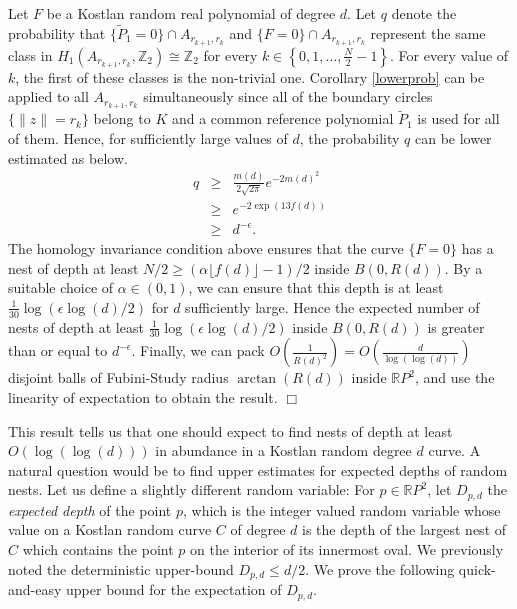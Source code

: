 \documentclass [11pt]{amsart}
\theoremstyle{remark}
\numberwithin{equation}{section}
\numberwithin{theorem}{section}
\begin{document}
Let $F$ be a Kostlan random real polynomial of degree $d$. Let $q$ denote the probability that $\{\widetilde{P}_{1}=0\}\cap A_{r_{k+1},r_{k}}$ and $\{F=0\}\cap A_{r_{k+1},r_{k}}$ represent the same class in $H_{1}(A_{r_{k+1}, r_{k}}, \mathbb{Z}_{2})\cong \mathbb{Z}_{2}$ for every $\displaystyle{k\in\left\{0,1,\ldots,\frac{N}{2}-1\right\}}$. For every value of $k$, the first of these classes is the non-trivial one. Corollary \ref{lowerprob} can be applied to all $A_{r_{k+1},r_{k}}$ simultaneously since all of the boundary circles $\{\|z\|=r_{k}\}$ belong to $K$ and a common reference polynomial $\widetilde{P}_{1}$ is used for all of them. Hence, for sufficiently large values of $d$, the probability $q$ can be lower estimated as below. 
\begin{eqnarray*} 
q&\geq& \frac{m(d)}{2\sqrt{2\pi}} e^{-2m(d)^2}\\
&\geq&e^{-2\exp(13f(d))} \\
&\geq& d^{-\epsilon}. 
\end{eqnarray*} 
The homology invariance condition above ensures that the curve $\{F=0\}$ has a nest of depth at least  $\displaystyle{N/2\geq (\alpha \lfloor f(d) \rfloor-1)/2}$ inside $B(0,R(d))$. By a suitable choice of $\alpha\in (0,1)$, we can ensure that this depth is at least $\displaystyle{\frac{1}{30}\log(\epsilon \log(d)/2)}$ for $d$ sufficiently large. Hence the expected number of nests of depth at least $\displaystyle{\frac{1}{30}\log(\epsilon \log(d)/2)}$ inside $B(0,R(d))$ is greater than or equal to $d^{-\epsilon}$. Finally, we can pack
 $\displaystyle{O\left( \frac{1}{R(d)^2}\right)=O\left(\frac{d}{\log(\log(d))}\right)}$ disjoint balls of Fubini-Study radius $\arctan(R(d))$ inside $\mathbb{R}P^2$, and use the linearity of expectation to obtain the result. \hfill $\Box$

This result tells us that one should expect to find nests of depth at least $O\left(\log(\log (d))\right)$ in abundance in a Kostlan random degree $d$ curve. A natural question would be to find upper estimates for expected depths of random nests. Let us define a slightly different random variable: For $p\in \mathbb{R}P^{2}$, let $D_{p,d}$ the {\it expected depth} of the point $p$, which is the integer valued random variable whose value on a Kostlan random curve $C$ of degree $d$ is the depth of the largest nest of $C$ which contains the point $p$ on the interior of its innermost oval. We previously noted the deterministic upper-bound $\displaystyle{ D_{p,d}\leq d/2}$. We prove the following quick-and-easy upper bound for the expectation of $D_{p,d}$. 
\end{document}
